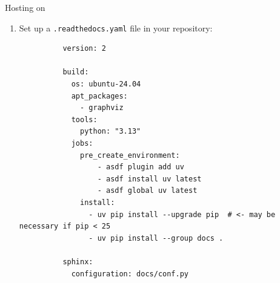\begin{darkframe}[fragile]{Hosting on \rtd}
  \begin{enumerate}
    \item Set up a \texttt{.readthedocs.yaml} file in your repository:
        \begin{verbatim}
          version: 2

          build:
            os: ubuntu-24.04
            apt_packages:
              - graphviz
            tools:
              python: "3.13"
            jobs:
              pre_create_environment:
                  - asdf plugin add uv
                  - asdf install uv latest
                  - asdf global uv latest
              install:
                - uv pip install --upgrade pip  # <- may be necessary if pip < 25
                - uv pip install --group docs .

          sphinx:
            configuration: docs/conf.py
        \end{verbatim}
  \end{enumerate}
\end{darkframe}

